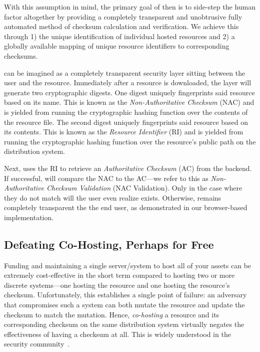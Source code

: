 With this assumption in mind, the primary goal of \SYSTEM{} then is to side-step
the human factor altogether by providing a completely transparent and
unobtrusive fully automated method of checksum calculation and verification. We
achieve this through 1) the unique identification of individual hosted resources
and 2) a globally available mapping of unique resource identifiers to
corresponding checksums.

\SYSTEM{} can be imagined as a completely transparent security layer sitting
between the user and the resource. Immediately after a resource is downloaded,
the \SYSTEM{} layer will generate two cryptographic digests. One digest uniquely
fingerprints said resource based on its name. This is known as the
\emph{Non-Authoritative Checksum} (NAC) and is yielded from running the
cryptographic hashing function over the contents of the resource file. The
second digest uniquely fingerprints said resource based on its contents. This is
known as the \emph{Resource Identifier} (RI) and is yielded from running the
cryptographic hashing function over the resource's public path on the
distribution system.

Next, \SYSTEM{} uses the RI to retrieve an \emph{Authoritative Checksum} (AC)
from the backend. If successful, \SYSTEM{} will compare the NAC to the AC---we
refer to this as \emph{Non-Authoritative Checksum Validation} (NAC Validation).
Only in the case where they do not match will the user even realize \SYSTEM{}
exists. Otherwise, \SYSTEM{} remains completely transparent the the end user, as
demonstrated in our browser-based implementation.


\subsection{Defeating Co-Hosting, Perhaps for Free}

Funding and maintaining a single server/system to host all of your assets can be
extremely cost-effective in the short term compared to hosting two or more
discrete systems---one hosting the resource and one hosting the resource's
checksum. Unfortunately, this establishes a single point of failure: an
adversary that compromises such a system can both mutate the resource and update
the checksum to match the mutation. Hence, \emph{co-hosting} a resource and its
corresponding checksum on the same distribution system virtually negates the
effectiveness of having a checksum at all. This is widely understood in the
security community~\cite{SCA-MINT2}.


